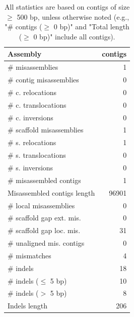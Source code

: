 \documentclass[12pt,a4paper]{article}
\begin{document}
\begin{table}[ht]
\begin{center}
\caption{All statistics are based on contigs of size $\geq$ 500 bp, unless otherwise noted (e.g., "\# contigs ($\geq$ 0 bp)" and "Total length ($\geq$ 0 bp)" include all contigs).}
\begin{tabular}{|l*{1}{|r}|}
\hline
Assembly & contigs \\ \hline
\# misassemblies & 1 \\ \hline
\hspace{2mm}\# contig misassemblies & 0 \\ \hline
\hspace{5mm}\# c. relocations & 0 \\ \hline
\hspace{5mm}\# c. translocations & 0 \\ \hline
\hspace{5mm}\# c. inversions & 0 \\ \hline
\hspace{2mm}\# scaffold misassemblies & 1 \\ \hline
\hspace{5mm}\# s. relocations & 1 \\ \hline
\hspace{5mm}\# s. translocations & 0 \\ \hline
\hspace{5mm}\# s. inversions & 0 \\ \hline
\# misassembled contigs & 1 \\ \hline
Misassembled contigs length & 96901 \\ \hline
\# local misassemblies & 0 \\ \hline
\# scaffold gap ext. mis. & 0 \\ \hline
\# scaffold gap loc. mis. & 31 \\ \hline
\# unaligned mis. contigs & 0 \\ \hline
\# mismatches & 4 \\ \hline
\# indels & 18 \\ \hline
\hspace{5mm}\# indels ($\leq$ 5 bp) & 10 \\ \hline
\hspace{5mm}\# indels ($>$ 5 bp) & 8 \\ \hline
Indels length & 206 \\ \hline
\end{tabular}
\end{center}
\end{table}
\end{document}

